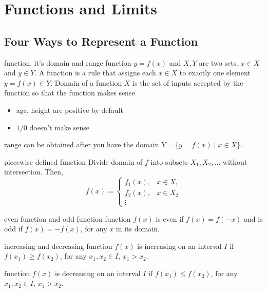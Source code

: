 \documentclass[Calculus 1 Recitation.tex]{subfiles}
\begin{document}
\section{Functions and Limits}
\subsection{Four Ways to Represent a Function}
\begin{myleftlinebox}
	function, it's domain and range
	\tcblower
	function $y=f(x)$ and $X, Y$ are two sets. $x\in X$ and $y\in Y$. A function is a rule that assigns each $x\in X$ to exactly one element $y=f(x)\in Y$. Domain of a function $X$ is the set of inputs accepted by the function so that the function makes sense.
	\begin{itemize}
		\item age, height are positive by default
		\item $1/0$ doesn't make sense
	\end{itemize}	
	range can be obtained after you have the domain $Y=\{y=f(x) \mid x\in X\}$.
\end{myleftlinebox}

\begin{myleftlinebox}
	piecewise defined function
	\tcblower
	Divide domain of $f$ into subsets $X_1,X_2,\dots$ without intersection. Then, 
	\[f(x) = \begin{cases}
		f_1(x), & x\in X_1\\
		f_2(x), & x\in X_2\\
		\vdots
	\end{cases}\]
\end{myleftlinebox}

\begin{myleftlinebox}
	even function and odd function
	\tcblower
	function $f(x)$ is even if $f(x)=f(-x)$ and is odd if $f(x)=-f(x)$, for any $x$ in its domain.
\end{myleftlinebox}

\begin{myleftlinebox}
	increasing and decreasing
	\tcblower
	function $f(x)$ is increasing on an interval $I$ if $f(x_1)\geq f(x_2)$, for any $x_1, x_2\in I$, $x_1>x_2$. 

	function $f(x)$ is decreasing on an interval $I$ if $f(x_1)\leq f(x_2)$, for any $x_1, x_2\in I$, $x_1>x_2$. 
\end{myleftlinebox}
\end{document}
